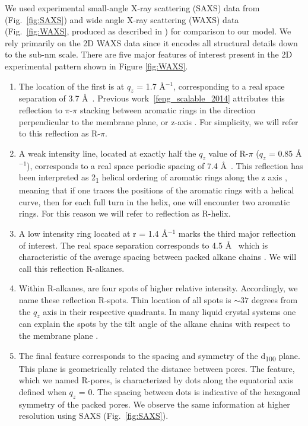 \documentclass{article}
\newcommand{\angstrom}{\textup{\AA}}
\begin{document}
  We used experimental small-angle X-ray scattering (SAXS) data from
  \cite{feng_thin_2016} (Fig.~\ref{fig:SAXS}) and wide angle X-ray scattering
  (WAXS) data (Fig.~\ref{fig:WAXS}, produced as described in
  \cite{feng_scalable_2014}) for comparison to our model. We rely primarily on the 2D WAXS data
  since it encodes all structural details down to the sub-nm scale.  There are
  five major features of interest present in the 2D experimental pattern shown in
  Figure \ref{fig:WAXS}.

  \begin{enumerate} 
  
	\item The location of the first is at $q_z$ = 1.7 \angstrom$^{-1}$,
	corresponding to a real space separation of 3.7 \angstrom~. Previous
	work~\ref{feng_scalable_2014} attributes this reflection to $\pi$-$\pi$
	stacking between aromatic rings in the direction perpendicular to the membrane
	plane, or z-axis \cite{feng_scalable_2014}. For simplicity, we will refer to
	this reflection as R-$\pi$.
 
	\item A weak intensity line, located at exactly half the $q_z$ value of
	R-$\pi$ ($q_z$ = 0.85 \angstrom$^{-1}$), corresponds to a real space periodic
	spacing of 7.4 \angstrom~. This reflection has been interpreted as
	2\textsubscript{1} helical ordering of aromatic rings along the z axis
	\cite{feng_scalable_2014}, meaning that if one traces the positions of the
	aromatic rings with a helical curve, then for each full turn in the helix, one
	will encounter two aromatic rings. For this reason we will refer to reflection
	as R-helix. 

	\item A low intensity ring located at r = 1.4 \angstrom$^{-1}$ marks
	the third major reflection of interest. The real space separation corresponds
	to 4.5 \angstrom~ which is characteristic of the average spacing between packed
	alkane chains \cite{mcintosh_organization_1980}. We will call this reflection
	R-alkanes.

	\item Within R-alkanes, are four spots of higher relative intensity.
	Accordingly, we name these reflection R-spots. Thin location of all spots is $\sim 37$
	degrees from the $q_z$ axis in their respective quadrants. In many liquid
	crystal systems one can explain the spots by the tilt angle of the alkane chains
	with respect to the membrane plane \cite{govind_simple_2001}.
 
	\item The final feature corresponds to the spacing and symmetry of the
	d\textsubscript{100} plane. This plane is geometrically related the distance
	between pores.  The feature, which we named R-pores, is characterized by dots
	along the equatorial axis defined when $q_z$ = 0. The spacing between dots is
	indicative of the hexagonal symmetry of the packed pores. We observe the same
	information at higher resolution using SAXS (Fig.~\ref{fig:SAXS}). 

  \end{enumerate}
\end{document}
